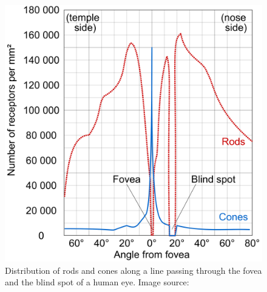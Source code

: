 \begin{figure}[h!]
\centering
\includegraphics[width=0.59\columnwidth]{images/other/cones_and_rods_distribution}
\caption[Distribtion of rods and cones]{Distribution of rods and cones along a line passing through the fovea and the blind spot of a human eye. Image source:~\cite{conesandrodsdistribution}}
\label{fig:cones_and_rods_distribution}
\end{figure}

